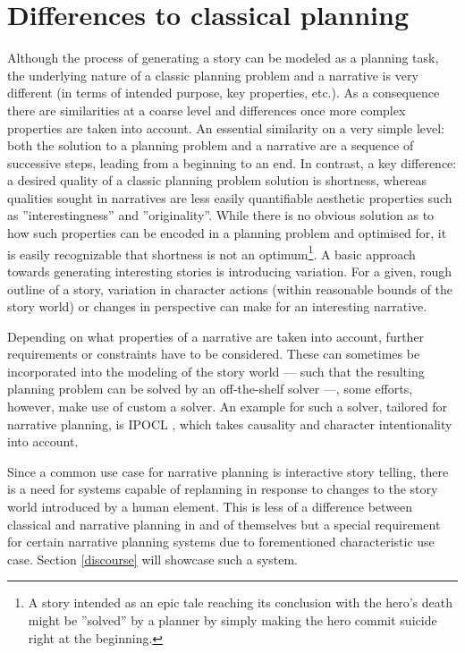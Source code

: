 \section{Differences to classical planning}\label{differences}
Although the process of generating a story can be modeled as a planning task, the underlying nature of a classic planning problem and a narrative is very different (in terms of intended purpose, key properties, etc.). As a consequence there are similarities at a coarse level and differences once more complex properties are taken into account. An essential similarity on a very simple level: both the solution to a planning problem and a narrative are a sequence of successive steps, leading from a beginning to an end. In contrast, a key difference: a desired quality of a classic planning problem solution is shortness, whereas qualities sought in narratives are less easily quantifiable aesthetic properties such as ''interestingness'' and ''originality''. While there is no obvious solution as to how such properties can be encoded in a planning problem and optimised for, it is easily recognizable that shortness is not an optimum\footnote{A story intended as an epic tale reaching its conclusion with the hero's death might be ''solved'' by a planner by simply making the hero commit suicide right at the beginning.}. A basic approach towards generating interesting stories is introducing variation. For a given, rough outline of a story, variation in character actions (within reasonable bounds of the story world) or changes in perspective can make for an interesting narrative.

Depending on what properties of a narrative are taken into account, further requirements or constraints have to be considered. These can sometimes be incorporated into the modeling of the story world --- such that the resulting planning problem can be solved by an off-the-shelf solver ---, some efforts, however, make use of custom a solver. An example for such a solver, tailored for narrative planning, is IPOCL \cite{Riedl04}, which takes causality and character intentionality into account.

Since a common use case for narrative planning is interactive story telling, there is a need for systems capable of replanning in response to changes to the story world introduced by a human element. This is less of a difference between classical and narrative planning in and of themselves but a special requirement for certain narrative planning systems due to forementioned characteristic use case. Section \ref{discourse} will showcase such a system.
%
%
%
